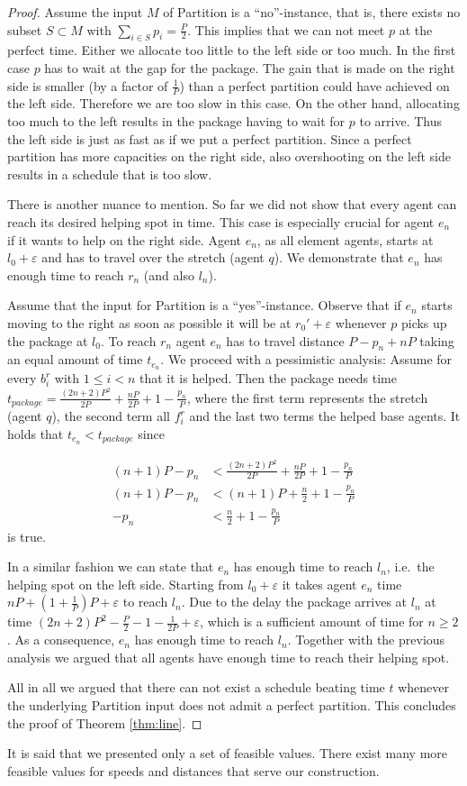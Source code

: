 \begin{proof}
    Assume the input $M$ of Partition is a ``no''-instance, that is, there exists no subset $S\subset M$ with $\sum_{i\in S} p_i = \frac{P}{2}$. This implies that we can not meet $p$ at the perfect time. Either we allocate too little to the left side or too much. In the first case $p$ has to wait at the gap for the package. The gain that is made on the right side is smaller (by a factor of $\frac{1}{P}$) than a perfect partition could have achieved on the left side. Therefore we are too slow in this case. On the other hand, allocating too much to the left results in the package having to wait for $p$ to arrive. Thus the left side is just as fast as if we put a perfect partition. Since a perfect partition has more capacities on the right side, also overshooting on the left side results in a schedule that is too slow.

    There is another nuance to mention. So far we did not show that every agent can reach its desired helping spot in time. This case is especially crucial for agent $e_n$ if it wants to help on the right side. Agent $e_n$, as all element agents, starts at $l_0+\varepsilon$ and has to travel over the stretch (agent $q$). We demonstrate that $e_n$ has enough time to reach $r_n$ (and also $l_n$).

Assume that the input for Partition is a ``yes''-instance. Observe that if $e_n$ starts moving to the right as soon as possible it will be at $r_0'+\varepsilon$ whenever $p$ picks up the package at $l_0$. To reach $r_n$ agent $e_n$ has to travel distance $P-p_n+nP$ taking an equal amount of time $t_{e_n}$. We proceed with a pessimistic analysis: Assume for every $b_i^r$ with $1\leq i<n$ that it is helped. Then the package needs time $t_{package}=\frac{(2n+2)P^2}{2P} +\frac{nP}{2P}+1- \frac{p_n}{P}$, where the first term represents the stretch (agent $q$), the second term all $f_i^r$ and the last two terms the helped base agents. It holds that $t_{e_n}<t_{package}$ since

\begin{align*}
    (n+1)P - p_n &< \frac{(2n+2)P^2}{2P} +\frac{nP}{2P}+1- \frac{p_n}{P}\\
    (n+1)P - p_n &<(n+1)P + \frac{n}{2} + 1 - \frac{p_n}{P}\\
    - p_n &< \frac{n}{2} + 1 - \frac{p_n}{P}
\end{align*}
is true. 

In a similar fashion we can state that $e_n$ has enough time to reach $l_n$, i.e.\ the helping spot on the left side. Starting from $l_0 +\varepsilon$ it takes agent $e_n$ time $nP+(1+\frac{1}{P})P+\varepsilon$ to reach $l_n$. Due to the delay the package arrives at $l_n$ at time $(2n+2)P^2-\frac{P}{2}-1-\frac{1}{2P} + \varepsilon$, which is a sufficient amount of time for $n\geq 2$. As a consequence, $e_n$ has enough time to reach $l_n$. Together with the previous analysis we argued that all agents have enough time to reach their helping spot.

All in all we argued that there can not exist a schedule beating time $t$ whenever the underlying Partition input does not admit a perfect partition. This concludes the proof of Theorem \ref{thm:line}.
\end{proof}
It is said that we presented only a set of feasible values. There exist many more feasible values for speeds and distances that serve our construction.